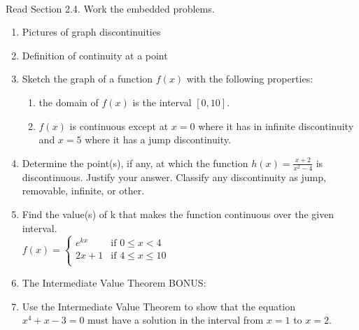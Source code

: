 \documentclass[11pt,fleqn]{article}
\begin{document}
\renewcommand{\headrulewidth}{0pt}
\newcommand{\blank}[1]{\rule{#1}{0.75pt}}
\newcommand{\bc}{\begin{center}}
\newcommand{\ec}{\end{center}}
\renewcommand{\d}{\displaystyle}

\vspace*{-0.7in}

\begin{center}
  \large
  \\
\end{center}
Read Section 2.4. Work the embedded problems. \\
\hrulefill

\begin{enumerate}
\item Pictures of graph discontinuities
\vfill
\item Definition of continuity at a point
\vfill
\item Sketch the graph of a function $f(x)$ with the following properties:\\
\begin{enumerate}
\item the domain of $f(x)$ is the interval $[0,10].$
\item $f(x)$ is continuous except at $x=0$ where it has in infinite discontinuity and $x=5$ where it has a jump discontinuity.
\end{enumerate}
\vfill
\newpage
\item Determine the point(s), if any, at which the function \mbox{$h(x)=\frac{x+2}{x^2-4}$} is discontinuous. Justify your answer. Classify any discontinuity as jump, removable, infinite, or other.
\vfill
\item Find the value(s) of k that makes the function continuous over the given interval.\\
$f(x)=\begin{cases} e^{kx} & \text{if } 0 \leq x < 4 \\
				2x+1 & \text{if } 4 \leq x \leq 10 \\
				\end{cases}$
\vspace{1in}
\item The Intermediate Value Theorem
\vfill
BONUS:
\item Use the Intermediate Value Theorem to show that the equation $x^4+x-3=0$ must have a solution in
the interval from $x=1$ to $x=2.$
\vfill

\end{enumerate}
\end{document}
